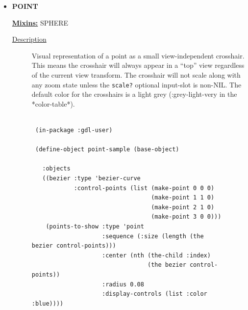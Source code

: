 \documentclass [11pt]{book}
\begin{document}
\begin{itemize}







\item {}
\textbf{POINT}


\textbf{
\underline{Mixins:}} SPHERE





\begin{description}

\item [
\underline{Description}]


Visual representation of a point as a small view-independent crosshair. This means
the crosshair will always appear in a ``top'' view regardless of the current view transform. The crosshair will
not scale along with any zoom state unless the \texttt{scale?} optional input-slot is non-NIL. The default
color for the crosshairs is a light grey (:grey-light-very in the *color-table*).



\end{description}




\begin{figure}
\begin{lrbox}{\boxedverb}
\begin{minipage}{\linewidth}
{\small

\begin{verbatim}

 (in-package :gdl-user)

 (define-object point-sample (base-object)
   
   :objects
   ((bezier :type 'bezier-curve
            :control-points (list (make-point 0 0 0)
                                  (make-point 1 1 0)
                                  (make-point 2 1 0)
                                  (make-point 3 0 0)))
    (points-to-show :type 'point
                    :sequence (:size (length (the bezier control-points)))
                    :center (nth (the-child :index) 
                                 (the bezier control-points))
                    :radius 0.08
                    :display-controls (list :color :blue))))


\end{verbatim}}
\end{minipage}
\end{lrbox}
\end{figure}
\end{itemize}
\end{document}
